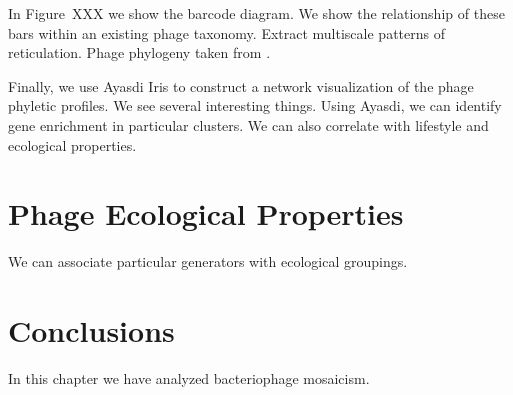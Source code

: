 In Figure~XXX we show the barcode diagram.
We show the relationship of these bars within an existing phage taxonomy.
Extract multiscale patterns of reticulation.
Phage phylogeny taken from \cite{Glazko:2007dc}.

Finally, we use Ayasdi Iris to construct a network visualization of the phage phyletic profiles.
We see several interesting things.
Using Ayasdi, we can identify gene enrichment in particular clusters.
We can also correlate with lifestyle and ecological properties.

\section{Phage Ecological Properties}
\label{phage:sec:ecological_properties}

We can associate particular generators with ecological groupings.

\section{Conclusions}
\label{phage:sec:conclusions}

In this chapter we have analyzed bacteriophage mosaicism.